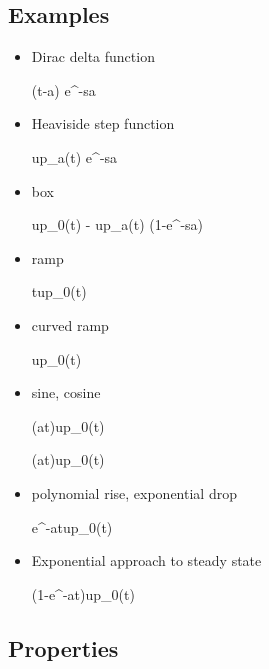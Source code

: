 \subsection{Examples}
\begin{itemize}

\item
Dirac delta function

\beq
\delta(t-a)
\maparrow{\call}
e^{-sa}
\eeq

\item 
Heaviside step function



\beq
up_a(t)
\maparrow{\call}
e^{-sa}\quad {}
\eeq

\item box

\beq
up_0(t) - up_a(t)
\maparrow{\call} 
(1-e^{-sa})\quad{}
\eeq

\item ramp

\beq
t\;up_0(t)
\maparrow{\call}
\quad{}
\eeq

\item curved ramp

\beq
{}up_0(t) 
\maparrow{\call}
\quad {}
\eeq

\item sine, cosine

\beq
\sin(at)up_0(t) \maparrow{\call}
\eeq

\beq
\cos(at)up_0(t) \maparrow{\call}
\eeq

\item
polynomial rise, exponential drop

\beq
{}e^{-at}\;up_0(t)
\maparrow{\call}
\quad{}
\eeq

\item Exponential approach to steady state

\beq
(1-e^{-at})up_0(t)
\maparrow{\call}
\quad {}
\eeq
\end{itemize}

\subsection{Properties}

